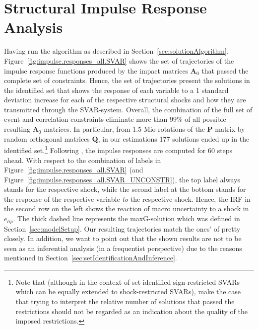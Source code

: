 \documentclass[a4paper,11pt,listof=nochaptergap,oneside,pointednumbers,bibtotoc,bigheadings,liststotoc,hidelinks]{scrbook}
\theoremstyle{mysatz}
\theoremstyle{mydefinition}
\theoremstyle{mytheorem}
\theoremstyle{mybemerkung}
\newcommand{\vect}[1]{\boldsymbol{\mathbf{#1}}}
\begin{document}
\section[Structural Impulse Response Analysis]{Structural Impulse Response Analysis}
\label{sec:ImpulseResponseAnalysis}
Having run the algorithm as described in Section~\ref{sec:solutionAlgorithm}, Figure~\ref{fig:impulse.responses_all.SVAR} shows the set of trajectories of the impulse response functions produced by the impact matrices $\vect{A}_0$ that passed the complete set of constraints. Hence, the set of trajectories present the solutions in the identified set that shows the response of each variable to a 1 standard deviation increase for each of the respective structural shocks and how they are transmitted through the SVAR-system. Overall, the combination of the full set of event and correlation constraints eliminate more than 99\% of all possible resulting $\vect{A}_0$-matrices. In particular, from 1.5 Mio rotations of the $\vect{P}$ matrix by random orthogonal matrices $\vect{Q}$, in our estimations 177 solutions ended up in the identified set.\footnote{Note that (although in the context of set-identified sign-restricted SVARs which can be equally extended to shock-restricted SVARs), \citet{lutkepohlkilian:17} make the case that trying to interpret the relative number of solutions that passed the restrictions should not be regarded as an indication about the quality of the imposed restrictions.}
 Following \citet{ludvigsonetal:19}, the impulse responses are computed for 60 steps ahead. With respect to the combination of labels in Figure~\ref{fig:impulse.responses_all.SVAR} (and Figure~\ref{fig:impulse.responses_all.SVAR_UNCONSTR}), the top label always stands for the respective shock, while the second label at the bottom stands for the response of the respective variable \textit{to} the respective shock. Hence, the IRF in the second row on the left shows the reaction of macro uncertainty to a shock in $e_{lip}$. The thick dashed line represents the maxG-solution which was defined in Section~\ref{sec:modelSetup}. Our resulting trajectories match the ones' of \citet{ludvigsonetal:19} pretty closely. In addition, we want to point out that the shown results are not to be seen as an inferential analysis (in a frequentist perspective) due to the reasons mentioned in Section~\ref{sec:setIdentificationAndInference}.
\end{document}
